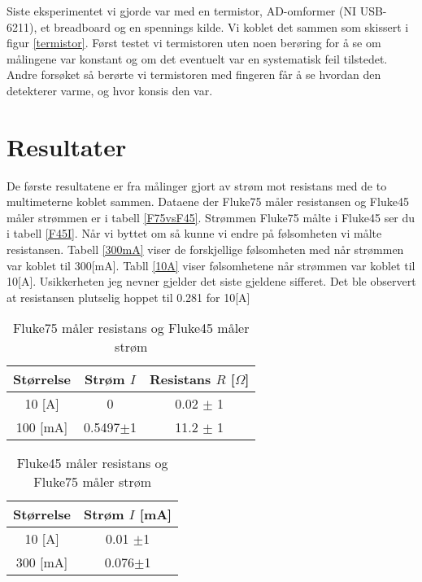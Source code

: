 \documentclass[norsk,a4paper,12pt]{article}
\begin{document}
Siste eksperimentet vi gjorde var med en termistor, AD-omformer (NI USB-6211), et breadboard og en spennings kilde. Vi koblet det sammen som skissert i figur \vref{termistor}. Først testet vi termistoren uten noen berøring for å se om målingene var konstant og om det eventuelt var en systematisk feil tilstedet. Andre forsøket så berørte vi termistoren med fingeren får å se hvordan den detekterer varme, og hvor konsis den var. 

\newpage

\section{Resultater}

De første resultatene er fra målinger gjort av strøm mot resistans med de to multimeterne koblet sammen. Dataene der Fluke75 måler resistansen og Fluke45 måler strømmen er i tabell \vref{F75vsF45}. Strømmen Fluke75 målte i Fluke45 ser du i tabell \vref{F45I}. Når vi byttet om så kunne vi endre på følsomheten vi målte resistansen. Tabell \vref{300mA} viser de forskjellige følsomheten med når strømmen var koblet til 300[mA]. Tabll \vref{10A} viser følsomhetene når strømmen var koblet til 10[A]. Usikkerheten jeg nevner gjelder det siste gjeldene sifferet. Det ble observert at resistansen plutselig hoppet til 0.281 for 10[A]

\begin{table}[h!]
 	 \centering
 	 \caption[F75 vs F45 Strøm mot resistans]{Fluke75 måler resistans og Fluke45 måler strøm}
  		\begin{tabular}{|c|c|c|} \hline
  		\textbf{Størrelse}&\textbf{Strøm $I$} &\textbf{Resistans $R$ [$\Omega$]} \\ \hline
  		 10 [A] & 0& 0.02  $\pm$ 1\\
  		100 [mA] &0.5497$\pm$1 & 11.2 $\pm$ 1 \\ \hline
  		\end{tabular}
  	\label{F75vsF45}
\end{table}

\begin{table}[h!]
 	 \centering
 	 \caption[Strøm i F75 målt med F45]{Fluke45 måler resistans og Fluke75 måler strøm}
  		\begin{tabular}{|c|c|} \hline
  		\textbf{Størrelse}&\textbf{Strøm $I$ [mA]} \\ \hline
  		 10 [A] & 0.01 $\pm$1 \\
  		300 [mA] &0.076$\pm$1 \\ \hline
  		\end{tabular}
  	\label{F45I}
\end{table}
\end{document}
